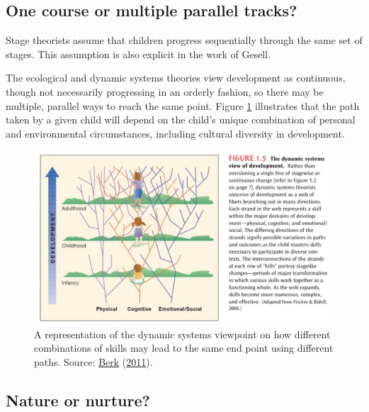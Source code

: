 \documentclass[
]{book}
\begin{document}
\hypertarget{one-course-or-multiple-parallel-tracks}{%
\subsection{One course or multiple parallel tracks?}\label{one-course-or-multiple-parallel-tracks}}

Stage theorists assume that children progress sequentially through the same set of stages. This assumption is also explicit in the work of Gesell.

The ecological and dynamic systems theories view development as continuous, though not necessarily progressing in an orderly fashion, so there may be multiple, parallel ways to reach the same point. Figure \ref{fig:dynamic} illustrates that the path taken by a given child will depend on the child's unique combination of personal and environmental circumstances, including cultural diversity in development.

\begin{figure}

{\centering \includegraphics[width=1\linewidth]{fig/dynamic} 

}

\caption{A representation of the dynamic systems viewpoint on how different combinations of skills may lead to the same end point using different paths. Source: \protect\hyperlink{ref-berk2013}{Berk} (\protect\hyperlink{ref-berk2013}{2011}).}\label{fig:dynamic}
\end{figure}



\hypertarget{nature-or-nurture}{%
\subsection{Nature or nurture?}\label{nature-or-nurture}}
\end{document}
